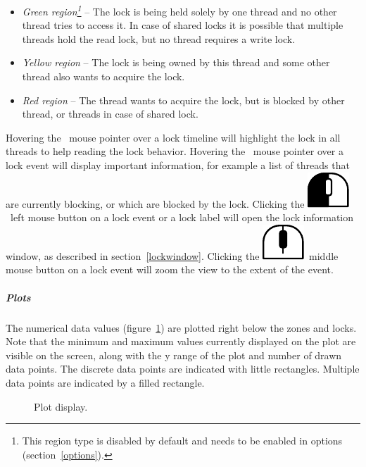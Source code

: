 \documentclass[hidelinks,titlepage,a4paper]{article}
\newcommand{\LMB}{\includegraphics[height=.8\baselineskip]{icons/lmb}}
\newcommand{\MMB}{\includegraphics[height=.8\baselineskip]{icons/mmb}}
\begin{document}
\begin{itemize}
\item \emph{Green region\footnote{This region type is disabled by default and needs to be enabled in options (section~\ref{options}).}} -- The lock is being held solely by one thread and no other thread tries to access it. In case of shared locks it is possible that multiple threads hold the read lock, but no thread requires a write lock.
\item \emph{Yellow region} -- The lock is being owned by this thread and some other thread also wants to acquire the lock.
\item \emph{Red region} -- The thread wants to acquire the lock, but is blocked by other thread, or threads in case of shared lock.
\end{itemize}

Hovering the \faMousePointer{}~mouse pointer over a lock timeline will highlight the lock in all threads to help reading the lock behavior. Hovering the \faMousePointer{}~mouse pointer over a lock event will display important information, for example a list of threads that are currently blocking, or which are blocked by the lock. Clicking the \LMB{}~left mouse button on a lock event or a lock label will open the lock information window, as described in section~\ref{lockwindow}. Clicking the \MMB{}~middle mouse button on a lock event will zoom the view to the extent of the event.

\subparagraph{Plots}
\label{plots}

The numerical data values (figure~\ref{plot}) are plotted right below the zones and locks. Note that the minimum and maximum values currently displayed on the plot are visible on the screen, along with the y range of the plot and number of drawn data points. The discrete data points are indicated with little rectangles. Multiple data points are indicated by a filled rectangle.

\begin{figure}[h]
\centering{}
\caption{Plot display.}
\label{plot}
\end{figure}
\end{document}
